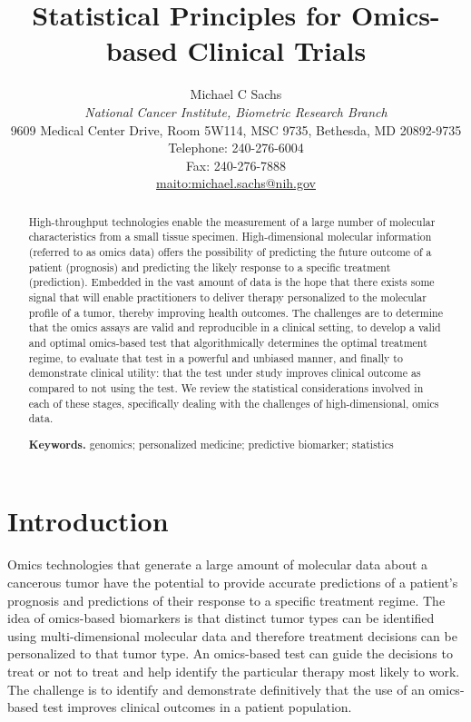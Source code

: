 \documentclass[11pt]{article}
\title{\bigskip \bigskip Statistical Principles for Omics-based Clinical Trials}
\author{\Large Michael C Sachs\vspace{0.05in} \\ \normalsize\emph{National Cancer Institute, Biometric Research Branch} \\ 
\footnotesize 9609 Medical Center Drive, Room 5W114, MSC 9735, Bethesda, MD 20892-9735 \\
\footnotesize Telephone: 240-276-6004 \\
\footnotesize Fax: 240-276-7888 \\
 \url{maito:michael.sachs@nih.gov}\vspace*{0.2in}\\ }
\begin{document}
  
		




\maketitle


\begin{abstract}

\noindent High-throughput technologies enable the measurement of a large number of
molecular characteristics from a small tissue specimen. High-dimensional
molecular information (referred to as omics data) offers the possibility
of predicting the future outcome of a patient (prognosis) and predicting
the likely response to a specific treatment (prediction). Embedded in
the vast amount of data is the hope that there exists some signal that
will enable practitioners to deliver therapy personalized to the
molecular profile of a tumor, thereby improving health outcomes. The
challenges are to determine that the omics assays are valid and
reproducible in a clinical setting, to develop a valid and optimal
omics-based test that algorithmically determines the optimal treatment
regime, to evaluate that test in a powerful and unbiased manner, and
finally to demonstrate clinical utility: that the test under study
improves clinical outcome as compared to not using the test. We review
the statistical considerations involved in each of these stages,
specifically dealing with the challenges of high-dimensional, omics
data.

\smallskip
\noindent \textbf{Keywords.} genomics; personalized medicine; predictive biomarker; statistics

\end{abstract}


\section{Introduction}\label{introduction}

Omics technologies that generate a large amount of molecular data about
a cancerous tumor have the potential to provide accurate predictions of
a patient's prognosis and predictions of their response to a specific
treatment regime. The idea of omics-based biomarkers is that distinct
tumor types can be identified using multi-dimensional molecular data and
therefore treatment decisions can be personalized to that tumor type. An
omics-based test can guide the decisions to treat or not to treat and
help identify the particular therapy most likely to work. The challenge
is to identify and demonstrate definitively that the use of an
omics-based test improves clinical outcomes in a patient population.
\end{document}
